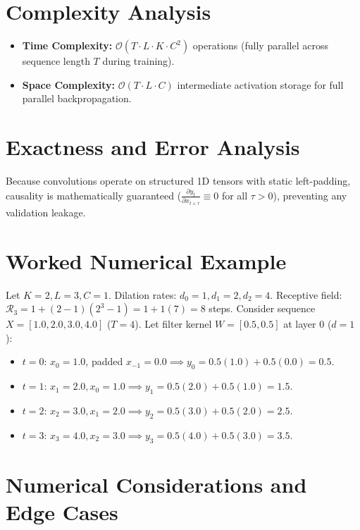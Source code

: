 \documentclass[11pt,a4paper]{article}
\theoremstyle{definition}
\begin{document}
\section{Complexity Analysis}

\begin{itemize}
    \item \textbf{Time Complexity:} $\mathcal{O}(T \cdot L \cdot K \cdot C^2)$ operations (fully parallel across sequence length $T$ during training).
    \item \textbf{Space Complexity:} $\mathcal{O}(T \cdot L \cdot C)$ intermediate activation storage for full parallel backpropagation.
\end{itemize}

\section{Exactness and Error Analysis}

Because convolutions operate on structured 1D tensors with static left-padding, causality is mathematically guaranteed ($\frac{\partial y_t}{\partial x_{t + \tau}} \equiv 0$ for all $\tau > 0$), preventing any validation leakage.

\section{Worked Numerical Example}

Let $K=2, L=3, C=1$.
Dilation rates: $d_0 = 1, d_1 = 2, d_2 = 4$.
Receptive field: $\mathcal{R}_3 = 1 + (2 - 1)(2^3 - 1) = 1 + 1(7) = 8$ steps.
Consider sequence $X = [1.0, 2.0, 3.0, 4.0]$ ($T=4$).
Let filter kernel $W = [0.5, 0.5]$ at layer 0 ($d=1$):
\begin{itemize}
    \item $t=0$: $x_0=1.0$, padded $x_{-1}=0.0 \implies y_0 = 0.5(1.0) + 0.5(0.0) = 0.5$.
    \item $t=1$: $x_1=2.0, x_0=1.0 \implies y_1 = 0.5(2.0) + 0.5(1.0) = 1.5$.
    \item $t=2$: $x_2=3.0, x_1=2.0 \implies y_2 = 0.5(3.0) + 0.5(2.0) = 2.5$.
    \item $t=3$: $x_3=4.0, x_2=3.0 \implies y_3 = 0.5(4.0) + 0.5(3.0) = 3.5$.
\end{itemize}

\section{Numerical Considerations and Edge Cases}
\end{document}
